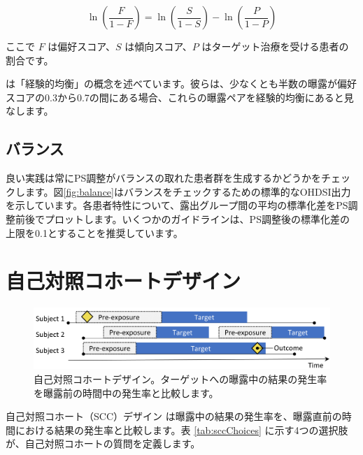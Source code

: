 \documentclass[
  11pt]{book}
\theoremstyle{definition}
\theoremstyle{definition}
\theoremstyle{definition}
\theoremstyle{definition}
\theoremstyle{remark}
\begin{document}
\[\ln\left(\frac{F}{1-F}\right)=\ln\left(\frac{S}{1-S}\right)-\ln\left(\frac{P}{1-P}\right)\]

ここで \(F\) は偏好スコア、\(S\) は傾向スコア、\(P\) はターゲット治療を受ける患者の割合です。

\citet{walker_2013} は「経験的均衡」の概念を述べています。彼らは、少なくとも半数の曝露が偏好スコアの0.3から0.7の間にある場合、これらの曝露ペアを経験的均衡にあると見なします。 

\subsection{バランス}\label{ux30d0ux30e9ux30f3ux30b9}

 

良い実践は常にPS調整がバランスの取れた患者群を生成するかどうかをチェックします。図\ref{fig:balance}はバランスをチェックするための標準的なOHDSI出力を示しています。各患者特性について、露出グループ間の平均の標準化差をPS調整前後でプロットします。いくつかのガイドラインは、PS調整後の標準化差の上限を0.1とすることを推奨しています。\citep[ ]{rubin_2001}

\section{自己対照コホートデザイン}\label{ux81eaux5df1ux5bfeux7167ux30b3ux30dbux30fcux30c8ux30c7ux30b6ux30a4ux30f3}


\begin{figure}[h]

{\centering \includegraphics[width=0.9\linewidth]{images/PopulationLevelEstimation/selfControlledCohort} 

}

\caption{自己対照コホートデザイン。ターゲットへの曝露中の結果の発生率を曝露前の時間中の発生率と比較します。}\label{fig:scc}
\end{figure}

自己対照コホート（SCC）デザイン \citep[ ]{ryan_2013} は曝露中の結果の発生率を、曝露直前の時間における結果の発生率と比較します。表 \ref{tab:sccChoices} に示す4つの選択肢が、自己対照コホートの質問を定義します。 
\end{document}
